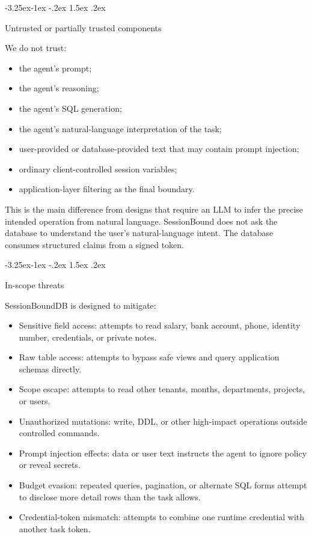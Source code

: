 \documentclass[10pt,twocolumn]{article}
\makeatletter
\providecommand{\tightlist}{%
  \setlength{\itemsep}{0pt}\setlength{\parskip}{0pt}}
\renewcommand\subsection{\@startsection{subsection}{2}{\z@}%
  {-3.25ex\@plus -1ex \@minus -.2ex}%
  {1.5ex \@plus .2ex}%
  {\normalfont\large\bfseries\raggedright}}
\makeatother
\begin{document}
\hypertarget{untrusted-or-partially-trusted-components}{%
\subsection{Untrusted or partially trusted
components}\label{untrusted-or-partially-trusted-components}}

We do not trust:

\begin{itemize}
\tightlist
\item
  the agent's prompt;
\item
  the agent's reasoning;
\item
  the agent's SQL generation;
\item
  the agent's natural-language interpretation of the task;
\item
  user-provided or database-provided text that may contain prompt
  injection;
\item
  ordinary client-controlled session variables;
\item
  application-layer filtering as the final boundary.
\end{itemize}

This is the main difference from designs that require an LLM to infer
the precise intended operation from natural language. SessionBound does
not ask the database to understand the user's natural-language intent.
The database consumes structured claims from a signed token.

\hypertarget{in-scope-threats}{%
\subsection{In-scope threats}\label{in-scope-threats}}

SessionBoundDB is designed to mitigate:

\begin{itemize}
\tightlist
\item
  Sensitive field access: attempts to read salary, bank
  account, phone, identity number, credentials, or private notes.
\item
  Raw table access: attempts to bypass safe views and query
  application schemas directly.
\item
  Scope escape: attempts to read other tenants, months,
  departments, projects, or users.
\item
  Unauthorized mutations: write, DDL, or other high-impact operations
  outside controlled commands.
\item
  Prompt injection effects: data or user text instructs the
  agent to ignore policy or reveal secrets.
\item
  Budget evasion: repeated queries, pagination, or alternate
  SQL forms attempt to disclose more detail rows than the task allows.
\item
  Credential-token mismatch: attempts to combine one runtime
  credential with another task token.
\end{itemize}
\end{document}
